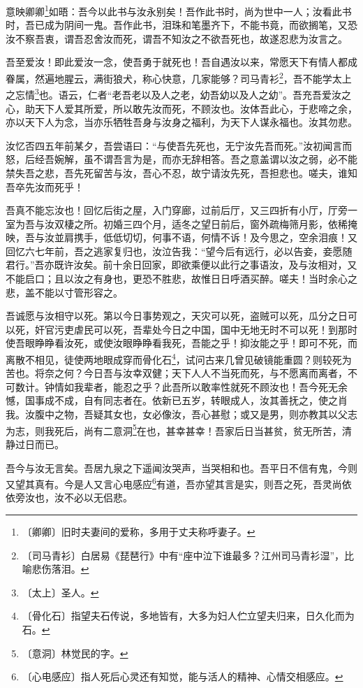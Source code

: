 \documentclass[12pt,UTF-8,openany,a4]{ctexbook}
\begin{document}
\begin{large}
    
    意映卿卿\footnote{〔卿卿〕\yiwen 旧时夫妻间的爱称，多用于丈夫称呼妻子。}如晤：吾今以此书与汝永别矣！吾作此书时，尚为世中一人；汝看此书时，吾已成为阴间一鬼。吾作此书，泪珠和笔墨齐下，不能书竟，而欲搁笔，又恐汝不察吾衷，谓吾忍舍汝而死，谓吾不知汝之不欲吾死也，故遂忍悲为汝言之。
    
    吾至爱汝！即此爱汝一念，使吾勇于就死也！吾自遇汝以来，常愿天下有情人都成眷属，然遍地腥云，满街狼犬，称心快意，几家能够？司马青衫\footnote{〔司马青衫〕\yiwen 白居易《琵琶行》中有“座中泣下谁最多？江州司马青衫湿”，比喻悲伤落泪。}，吾不能学太上之忘情\footnote{〔太上〕\yiwen 圣人。}也。语云，仁者“老吾老以及人之老，幼吾幼以及人之幼”。吾充吾爱汝之心，助天下人爱其所爱，所以敢先汝而死，不顾汝也。汝体吾此心，于悲啼之余，亦以天下人为念，当亦乐牺牲吾身与汝身之福利，为天下人谋永福也。汝其勿悲。
    
    汝忆否四五年前某夕，吾尝语曰：“与使吾先死也，无宁汝先吾而死。”汝初闻言而怒，后经吾婉解，虽不谓吾言为是，而亦无辞相答。吾之意盖谓以汝之弱，必不能禁失吾之悲，吾先死留苦与汝，吾心不忍，故宁请汝先死，吾担悲也。嗟夫，谁知吾卒先汝而死乎！
    
    吾真不能忘汝也！回忆后街之屋，入门穿廊，过前后厅，又三四折有小厅，厅旁一室为吾与汝双棲之所。初婚三四个月，适冬之望日前后，窗外疏梅筛月影，依稀掩映，吾与汝並肩携手，低低切切，何事不语，何情不诉！及今思之，空余泪痕！又回忆六七年前，吾之逃家复归也，汝泣告我：“望今后有远行，必以告妾，妾愿随君行。”吾亦既许汝矣。前十余日回家，即欲乘便以此行之事语汝，及与汝相对，又不能启口；且以汝之有身也，更恐不胜悲，故惟日日呼酒买醉。嗟夫！当时余心之悲，盖不能以寸管形容之。
    
    吾诚愿与汝相守以死。第以今日事势观之，天灾可以死，盗贼可以死，瓜分之日可以死，奸官污吏虐民可以死，吾辈处今日之中国，国中无地无时不可以死！到那时使吾眼睁睁看汝死，或使汝眼睁睁看我死，吾能之乎！抑汝能之乎！即可不死，而离散不相见，徒使两地眼成穿而骨化石\footnote{〔骨化石〕\yiwen 指望夫石传说，多地皆有，大多为妇人伫立望夫归来，日久化而为石。}，试问古来几曾见破镜能重圆？则较死为苦也。将奈之何？今日吾与汝幸双健；天下人人不当死而死，与不愿离而离者，不可数计。钟情如我辈者，能忍之乎？此吾所以敢率性就死不顾汝也！吾今死无余憾，国事成不成，自有同志者在。依新已五岁，转眼成人，汝其善抚之，使之肖我。汝腹中之物，吾疑其女也，女必像汝，吾心甚慰；或又是男，则亦教其以父志为志，则我死后，尚有二意洞\footnote{〔意洞〕\yiwen 林觉民的字。}在也，甚幸甚幸！吾家后日当甚贫，贫无所苦，清静过日而已。
    
    吾今与汝无言矣。吾居九泉之下遥闻汝哭声，当哭相和也。吾平日不信有鬼，今则又望其真有。今是人又言心电感应\footnote{〔心电感应〕\yiwen 指人死后心灵还有知觉，能与活人的精神、心情交相感应。}有道，吾亦望其言是实，则吾之死，吾灵尚依依旁汝也，汝不必以无侣悲。
    

\end{large}
\end{document}
